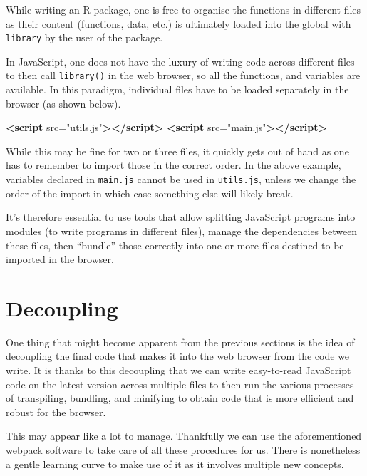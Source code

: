 \documentclass[10pt,]{krantz}
\makeatletter
\newenvironment{Shaded}{\begin{snugshade}}{\end{snugshade}}
\newcommand{\KeywordTok}[1]{\textcolor[rgb]{0.27,0.27,0.27}{\textbf{#1}}}
\newcommand{\OtherTok}[1]{\textcolor[rgb]{0.37,0.37,0.37}{#1}}
\newcommand{\StringTok}[1]{\textcolor[rgb]{0.5,0.5,0.5}{#1}}
\newenvironment{kframe}{%
\medskip{}
\setlength{\fboxsep}{.8em}
 \def\at@end@of@kframe{}%
 \ifinner\ifhmode%
  \def\at@end@of@kframe{\end{minipage}}%
  \begin{minipage}{\columnwidth}%
 \fi\fi%
 \def\FrameCommand##1{\hskip\@totalleftmargin \hskip-\fboxsep
 \colorbox{shadecolor}{##1}\hskip-\fboxsep
     \hskip-\linewidth \hskip-\@totalleftmargin \hskip\columnwidth}%
 \MakeFramed {\advance\hsize-\width
   \@totalleftmargin\z@ \linewidth\hsize
   \@setminipage}}%
 {\par\unskip\endMakeFramed%
 \at@end@of@kframe}
\renewenvironment{Shaded}{\begin{kframe}}{\end{kframe}}
\makeatother
\begin{document}
While writing an R package, one is free to organise the functions in different files as their content (functions, data, etc.) is ultimately loaded into the global  with \texttt{library} by the user of the package.

In JavaScript, one does not have the luxury of writing code across different files to then call \texttt{library()} in the web browser, so all the functions, and variables are available. In this paradigm, individual files have to be loaded separately in the browser (as shown below).

\begin{Shaded}
\begin{Highlighting}[]
\KeywordTok{<script}\OtherTok{ src=}\StringTok{"utils.js"}\KeywordTok{></script>}
\KeywordTok{<script}\OtherTok{ src=}\StringTok{"main.js"}\KeywordTok{></script>}
\end{Highlighting}
\end{Shaded}

While this may be fine for two or three files, it quickly gets out of hand as one has to remember to import those in the correct order. In the above example, variables declared in \texttt{main.js} cannot be used in \texttt{utils.js}, unless we change the order of the import in which case something else will likely break.

It's therefore essential to use tools that allow splitting JavaScript programs into modules (to write programs in different files), manage the dependencies between these files, then ``bundle'' those correctly into one or more files destined to be imported in the browser.

\hypertarget{webpack-decouple}{%
\section{Decoupling}\label{webpack-decouple}}

One thing that might become apparent from the previous sections is the idea of decoupling the final code that makes it into the web browser from the code we write. It is thanks to this decoupling that we can write easy-to-read JavaScript code on the latest version across multiple files to then run the various processes of transpiling, bundling, and minifying to obtain code that is more efficient and robust for the browser.

This may appear like a lot to manage. Thankfully we can use the aforementioned webpack software to take care of all these procedures for us. There is nonetheless a gentle learning curve to make use of it as it involves multiple new concepts.
\end{document}

